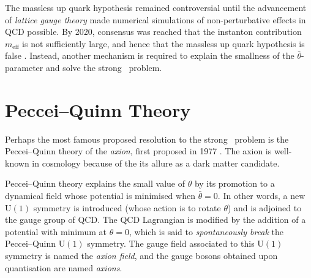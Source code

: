 The massless up quark hypothesis remained controversial until the advancement of \emph{lattice gauge theory} made numerical simulations of non-perturbative effects in QCD possible.
By 2020, consensus was reached that the instanton contribution $m_\text{eff}$ is not sufficiently large, and hence that the massless up quark hypothesis is false \cite{ruling-out-massless-uquark_2015,aoki2016review,ruling-out-massless-uquark_2020}.
Instead, another mechanism is required to explain the smallness of the $\bar\theta$-parameter and solve the strong \CP\ problem.





\section{Peccei--Quinn Theory}

Perhaps the most famous proposed resolution to the strong \CP\ problem is the Peccei--Quinn theory of the \emph{axion}, first proposed in 1977 \cite{PecceiQuinn_1977}.
The axion is well-known in cosmology because of the its allure as a dark matter candidate.

Peccei--Quinn theory explains the small value of $\theta$ by its promotion to a dynamical field whose potential is minimised when $\bar\theta = 0$.
In other words, a new $\mathrm{U}(1)$ symmetry is introduced (whose action is to rotate $\theta$) and is adjoined to the gauge group of QCD.
The QCD Lagrangian is modified by the addition of a potential with minimum at $\theta = 0$, which is said to \emph{spontaneously break} the Peccei--Quinn $\mathrm{U}(1)$ symmetry.
The gauge field associated to this $\mathrm{U}(1)$ symmetry is named the \emph{axion field}, and the gauge bosons obtained upon quantisation are named \emph{axions}.


